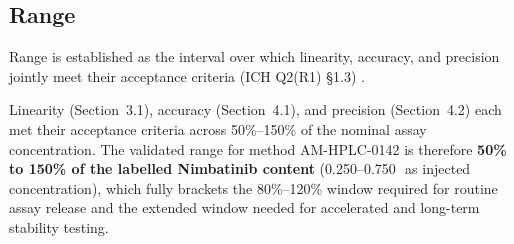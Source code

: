 \subsection{Range}
\begin{criteriabox}
Range is established as the interval over which linearity, accuracy, and precision jointly meet
their acceptance criteria (ICH Q2(R1) \S1.3) \citep{ich2005q2}.
\end{criteriabox}
Linearity (Section~3.1), accuracy (Section~4.1), and precision (Section~4.2) each met their
acceptance criteria across 50\%--150\% of the nominal assay concentration. The validated range
for method AM-HPLC-0142 is therefore \textbf{50\% to 150\% of the labelled Nimbatinib content}
(0.250--0.750\,\mgml\ as injected concentration), which fully brackets the 80\%--120\% window
required for routine assay release and the extended window needed for accelerated and
long-term stability testing.
